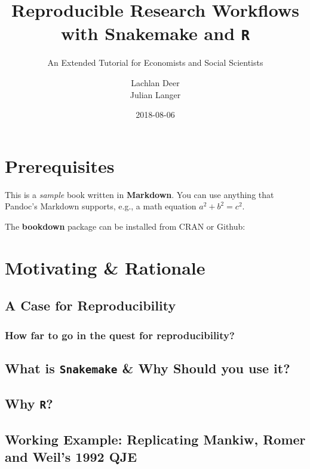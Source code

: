 \documentclass[]{book}
\title{Reproducible Research Workflows with Snakemake and \texttt{R}}
\subtitle{An Extended Tutorial for Economists and Social Scientists}
\author{Lachlan Deer \\ Julian Langer}
\date{2018-08-06}
\theoremstyle{definition}
\theoremstyle{definition}
\theoremstyle{definition}
\theoremstyle{remark}
\begin{document}
\maketitle

{
\setcounter{tocdepth}{1}
\tableofcontents
}
\chapter{Prerequisites}\label{prerequisites}

This is a \emph{sample} book written in \textbf{Markdown}. You can use
anything that Pandoc's Markdown supports, e.g., a math equation
\(a^2 + b^2 = c^2\).

The \textbf{bookdown} package can be installed from CRAN or Github:

\chapter{Motivating \& Rationale}\label{intro}

\section{A Case for Reproducibility}\label{a-case-for-reproducibility}

\subsection{How far to go in the quest for
reproducibility?}\label{how-far-to-go-in-the-quest-for-reproducibility}

\section{\texorpdfstring{What is \texttt{Snakemake} \& Why Should you
use
it?}{What is Snakemake \& Why Should you use it?}}\label{what-is-snakemake-why-should-you-use-it}

\section{\texorpdfstring{Why \texttt{R}?}{Why R?}}\label{why-r}

\section{Working Example: Replicating Mankiw, Romer and Weil's 1992
QJE}\label{working-example-replicating-mankiw-romer-and-weils-1992-qje}
\end{document}
